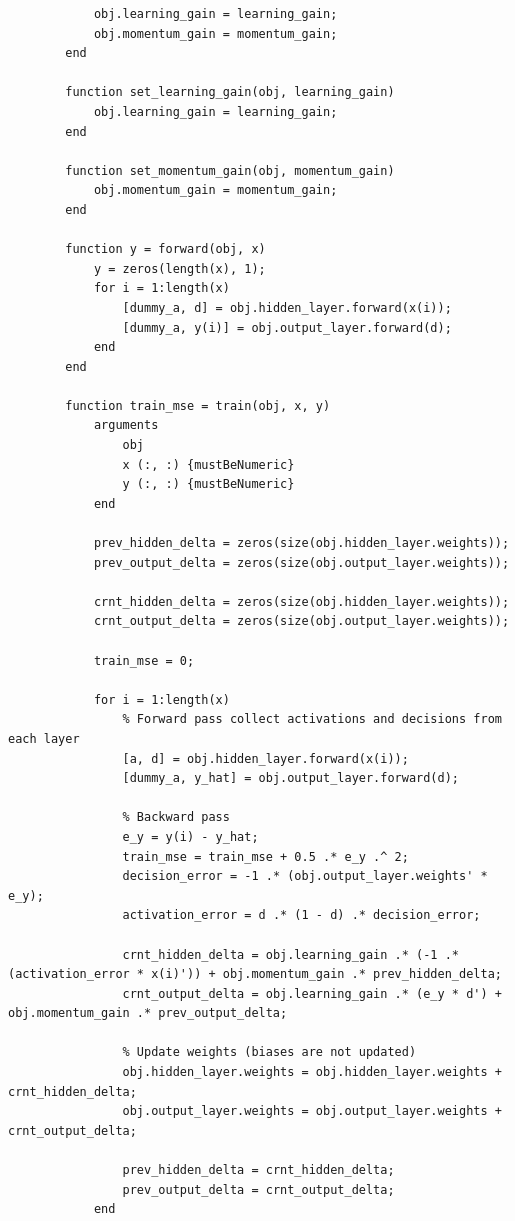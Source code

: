 \documentclass[11pt,pdftex,portrait,letterpaper]{article}
\begin{document}
\begin{lstlisting}
            obj.learning_gain = learning_gain;
            obj.momentum_gain = momentum_gain;
        end

        function set_learning_gain(obj, learning_gain)
            obj.learning_gain = learning_gain;
        end

        function set_momentum_gain(obj, momentum_gain)
            obj.momentum_gain = momentum_gain;
        end

        function y = forward(obj, x)
            y = zeros(length(x), 1);
            for i = 1:length(x)
                [dummy_a, d] = obj.hidden_layer.forward(x(i));
                [dummy_a, y(i)] = obj.output_layer.forward(d);
            end
        end

        function train_mse = train(obj, x, y)
            arguments
                obj
                x (:, :) {mustBeNumeric}
                y (:, :) {mustBeNumeric}
            end

            prev_hidden_delta = zeros(size(obj.hidden_layer.weights));
            prev_output_delta = zeros(size(obj.output_layer.weights));

            crnt_hidden_delta = zeros(size(obj.hidden_layer.weights));
            crnt_output_delta = zeros(size(obj.output_layer.weights));

            train_mse = 0;
            
            for i = 1:length(x)
                % Forward pass collect activations and decisions from each layer
                [a, d] = obj.hidden_layer.forward(x(i));
                [dummy_a, y_hat] = obj.output_layer.forward(d);

                % Backward pass
                e_y = y(i) - y_hat;
                train_mse = train_mse + 0.5 .* e_y .^ 2;
                decision_error = -1 .* (obj.output_layer.weights' * e_y);
                activation_error = d .* (1 - d) .* decision_error;

                crnt_hidden_delta = obj.learning_gain .* (-1 .* (activation_error * x(i)')) + obj.momentum_gain .* prev_hidden_delta;
                crnt_output_delta = obj.learning_gain .* (e_y * d') + obj.momentum_gain .* prev_output_delta;

                % Update weights (biases are not updated)
                obj.hidden_layer.weights = obj.hidden_layer.weights + crnt_hidden_delta;
                obj.output_layer.weights = obj.output_layer.weights + crnt_output_delta;

                prev_hidden_delta = crnt_hidden_delta;
                prev_output_delta = crnt_output_delta;
            end


\end{lstlisting}
\end{document}
